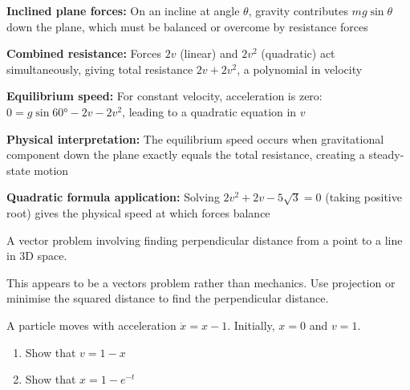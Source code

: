 \begin{takeaways}
\item \textbf{Inclined plane forces:} On an incline at angle $\theta$, gravity contributes $mg\sin\theta$ down the plane, which must be balanced or overcome by resistance forces
\item \textbf{Combined resistance:} Forces $2v$ (linear) and $2v^2$ (quadratic) act simultaneously, giving total resistance $2v + 2v^2$, a polynomial in velocity
\item \textbf{Equilibrium speed:} For constant velocity, acceleration is zero: $0 = g\sin 60° - 2v - 2v^2$, leading to a quadratic equation in $v$
\item \textbf{Physical interpretation:} The equilibrium speed occurs when gravitational component down the plane exactly equals the total resistance, creating a steady-state motion
\item \textbf{Quadratic formula application:} Solving $2v^2 + 2v - 5\sqrt{3} = 0$ (taking positive root) gives the physical speed at which forces balance
\end{takeaways}

\begin{problem}

A vector problem involving finding perpendicular distance from a point to a line in 3D space.
\end{problem}

\begin{hint}
This appears to be a vectors problem rather than mechanics. Use projection or minimise the squared distance to find the perpendicular distance.
\end{hint}

\begin{solution}
\end{solution}

\begin{problem}
A particle moves with acceleration $\ddot{x} = x - 1$. Initially, $x = 0$ and $v = 1$.
\begin{enumerate}[label=\textbf{\roman*.}]
    \item Show that $v = 1 - x$
    \item Show that $x = 1 - e^{-t}$
\end{enumerate}
\end{problem}

